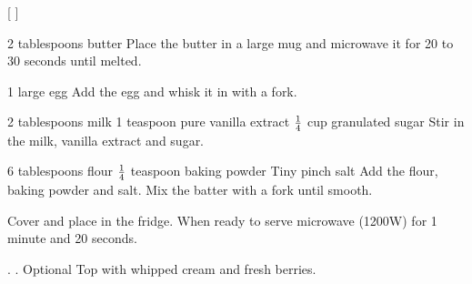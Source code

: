 
[
]

\begin{step}
2 tablespoons butter
\method
Place the butter in a large mug and microwave it for 20 to 30 seconds until melted.
\end{step}

\begin{step}
1 large egg
\method
Add the egg and whisk it in with a fork.
\end{step}

\begin{step}
2 tablespoons milk
1 teaspoon pure vanilla extract
$\frac{1}{4}$ cup granulated sugar
\method
Stir in the milk, vanilla extract and sugar.
\end{step}

\begin{step}
6 tablespoons flour
$\frac{1}{4}$ teaspoon baking powder
Tiny pinch salt
\method
Add the flour, baking powder and salt. Mix the batter with a fork until smooth.

Cover and place in the fridge. When ready to serve microwave (1200W) for 1 minute and 20 seconds.
\end{step}

\begin{step}
. . Optional
\method
Top with whipped cream and fresh berries.
\end{step}